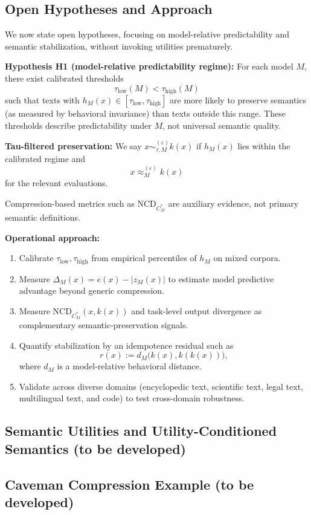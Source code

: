 \subsection{Open Hypotheses and Approach}
We now state open hypotheses, focusing on model-relative predictability and semantic stabilization, without invoking utilities prematurely.

\textbf{Hypothesis H1 (model-relative predictability regime):} For each model $M$, there exist calibrated thresholds
\[
\tau_{\mathrm{low}}(M) < \tau_{\mathrm{high}}(M)
\]
such that texts with $h_M(x) \in [\tau_{\mathrm{low}},\tau_{\mathrm{high}}]$ are more likely to preserve semantics (as measured by behavioral invariance) than texts outside this range. These thresholds describe predictability under $M$, not universal semantic quality.

\textbf{Tau-filtered preservation:} We say $x \sim_{\tau, M}^{(\varepsilon)} k(x)$ if $h_M(x)$ lies within the calibrated regime and
\[
x \approx_M^{(\varepsilon)} k(x)
\]
for the relevant evaluations.

Compression-based metrics such as $\mathrm{NCD}_{C_M^*}$ are auxiliary evidence, not primary semantic definitions.

\textbf{Operational approach:}
\begin{enumerate}
  \item Calibrate $\tau_{\mathrm{low}},\tau_{\mathrm{high}}$ from empirical percentiles of $h_M$ on mixed corpora.
  \item Measure $\Delta_M(x)=e(x)-|z_M(x)|$ to estimate model predictive advantage beyond generic compression.
  \item Measure $\mathrm{NCD}_{C_M^*}(x,k(x))$ and task-level output divergence as complementary semantic-preservation signals.
  \item Quantify stabilization by an idempotence residual such as
  \[
  r(x) := d_M\big(k(x), k(k(x))\big),
  \]
  where $d_M$ is a model-relative behavioral distance.
  \item Validate across diverse domains (encyclopedic text, scientific text, legal text, multilingual text, and code) to test cross-domain robustness.
\end{enumerate}

\subsection{Semantic Utilities and Utility-Conditioned Semantics (to be developed)}

\subsection{Caveman Compression Example (to be developed)}
